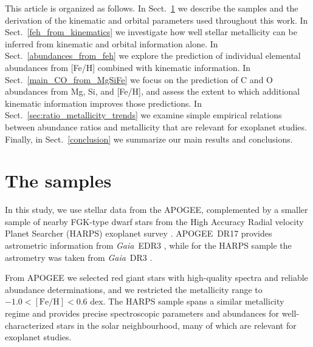 \documentclass{aa}
\begin{document}
This article is organized as follows. In Sect.~\ref{sample} we describe the samples and the derivation of the kinematic and orbital parameters used throughout this work. In Sect.~\ref{feh_from_kinematics} we investigate how well stellar metallicity can be inferred from kinematic and orbital information alone. In Sect.~\ref{abundances_from_feh} we explore the prediction of individual elemental abundances from [Fe/H] combined with kinematic information. In Sect.~\ref{main_CO_from_MgSiFe} we focus on the prediction of C and O abundances from Mg, Si, and [Fe/H], and assess the extent to which additional kinematic information improves those predictions. In Sect.~\ref{sec:ratio_metallicity_trends} we examine simple empirical relations between abundance ratios and metallicity that are relevant for exoplanet studies. Finally, in Sect.~\ref{conclusion} we summarize our main results and conclusions. %


\section{The samples} \label{sample}


In this study, we use stellar data from the APOGEE, complemented by a smaller sample of nearby FGK-type dwarf stars from the High Accuracy Radial velocity Planet Searcher (HARPS) exoplanet survey \citep{Mayor-03, Adibekyan-12}. APOGEE~DR17 provides astrometric information from \textit{Gaia}~EDR3 \citep{Gaia-21}, while for the HARPS sample the astrometry was taken from \textit{Gaia}~DR3 \citep{Gaia-23}.

From APOGEE we selected red giant stars with high-quality spectra and reliable abundance determinations, and we restricted the metallicity range to $-1.0 < [\mathrm{Fe/H}] < 0.6$ dex. The HARPS sample spans a similar metallicity regime and provides precise spectroscopic parameters and abundances for well-characterized stars in the solar neighbourhood, many of which are relevant for exoplanet studies.
\end{document}
